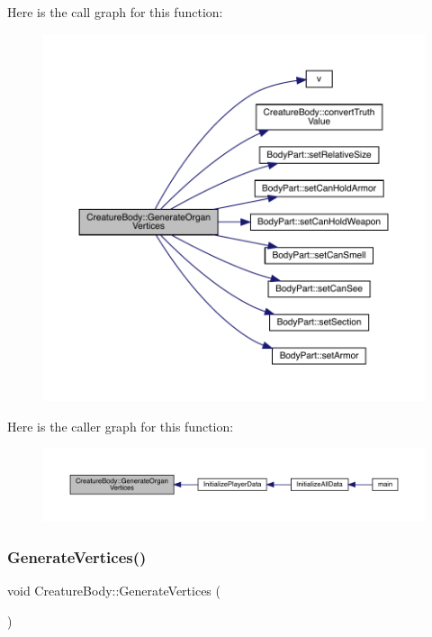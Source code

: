 Here is the call graph for this function\+:
\nopagebreak
\begin{figure}[H]
\begin{center}
\leavevmode
\includegraphics[width=350pt]{da/d7d/class_creature_body_a9cf5cffe6209ed851bf32c2b164d9391_cgraph}
\end{center}
\end{figure}
Here is the caller graph for this function\+:
\nopagebreak
\begin{figure}[H]
\begin{center}
\leavevmode
\includegraphics[width=350pt]{da/d7d/class_creature_body_a9cf5cffe6209ed851bf32c2b164d9391_icgraph}
\end{center}
\end{figure}
\mbox{\label{class_creature_body_af7047fb13005abbb9a816c0dd64af873}} 
\subsubsection{\texorpdfstring{Generate\+Vertices()}{GenerateVertices()}}
{\footnotesize\ttfamily void Creature\+Body\+::\+Generate\+Vertices (\begin{DoxyParamCaption}{ }\end{DoxyParamCaption})}

